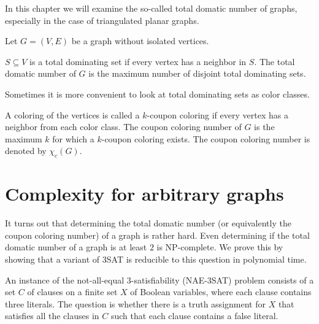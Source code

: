 In this chapter we will examine the so-called total domatic number of graphs,
especially in the case of triangulated planar graphs.

Let $G = (V, E)$ be a graph without isolated vertices.

\begin{definition}
  $S \subseteq V$ is a total dominating set if every vertex has a neighbor in
  $S$. The total domatic number of $G$ is the maximum number of disjoint total
  dominating sets.
\end{definition}

Sometimes it is more convenient to look at total dominating sets as color classes.

\begin{definition}
  A coloring of the vertices is called a $k$-coupon coloring if every vertex
  has a neighbor from each color class. The coupon coloring number of $G$ is
  the maximum $k$ for which a $k$-coupon coloring exists. The coupon coloring
  number is denoted by $\chi_c(G)$.
\end{definition}

\section{Complexity for arbitrary graphs}

It turns out that determining the total domatic number (or equivalently the
coupon coloring number) of a graph is rather hard. Even determining if the total
domatic number of a graph is at least $2$ is NP-complete. We prove this by showing
that a variant of 3SAT is reducible to this question in polynomial time.

\begin{definition}
  An instance of the not-all-equal 3-satisfiability (NAE-3SAT) problem consists of
  a set $C$ of clauses on a finite set $X$ of Boolean variables, where each clause
  contains three literals. The question is whether there is a truth assignment for
  $X$ that satisfies all the clauses in $C$ such that each clause contains a false
  literal.
\end{definition}

